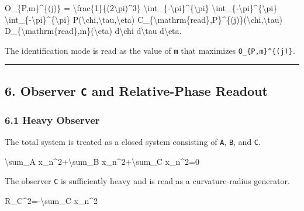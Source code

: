 \documentclass[
  a4paper,
]{article}
\newenvironment{Shaded}{}{}
\newcommand{\NormalTok}[1]{#1}
\begin{document}
\begin{Shaded}
\begin{Highlighting}[]
\NormalTok{O\_\{P,m\}\^{}\{(j)\}}
\NormalTok{=}
\NormalTok{\textbackslash{}frac\{1\}\{(2\textbackslash{}pi)\^{}3\}}
\NormalTok{\textbackslash{}int\_\{{-}\textbackslash{}pi\}\^{}\{\textbackslash{}pi\}}
\NormalTok{\textbackslash{}int\_\{{-}\textbackslash{}pi\}\^{}\{\textbackslash{}pi\}}
\NormalTok{\textbackslash{}int\_\{{-}\textbackslash{}pi\}\^{}\{\textbackslash{}pi\}}
\NormalTok{P(\textbackslash{}chi,\textbackslash{}tau,\textbackslash{}eta)}
\NormalTok{C\_\{\textbackslash{}mathrm\{read\},P\}\^{}\{(j)\}(\textbackslash{}chi,\textbackslash{}tau)}
\NormalTok{D\_\{\textbackslash{}mathrm\{read\},m\}(\textbackslash{}eta)}
\NormalTok{d\textbackslash{}chi d\textbackslash{}tau d\textbackslash{}eta.}
\end{Highlighting}
\end{Shaded}

The identification mode is read as the value of \texttt{m} that
maximizes \texttt{\textbar{}O\_\{P,m\}\^{}\{(j)\}\textbar{}}.

\begin{center}\rule{0.5\linewidth}{0.5pt}\end{center}

\subsection{\texorpdfstring{6. Observer \texttt{C} and Relative-Phase
Readout}{6. Observer C and Relative-Phase Readout}}\label{observer-c-and-relative-phase-readout}

\subsubsection{6.1 Heavy Observer}\label{heavy-observer}

The total system is treated as a closed system consisting of \texttt{A},
\texttt{B}, and \texttt{C}.

\begin{Shaded}
\begin{Highlighting}[]
\NormalTok{\textbackslash{}sum\_A x\_n\^{}2+\textbackslash{}sum\_B x\_n\^{}2+\textbackslash{}sum\_C x\_n\^{}2=0}
\end{Highlighting}
\end{Shaded}

The observer \texttt{C} is sufficiently heavy and is read as a
curvature-radius generator.

\begin{Shaded}
\begin{Highlighting}[]
\NormalTok{R\_C\^{}2={-}\textbackslash{}sum\_C x\_n\^{}2}
\end{Highlighting}
\end{Shaded}
\end{document}
